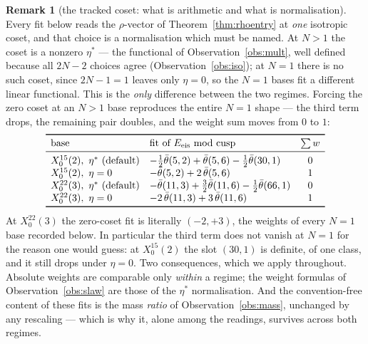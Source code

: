 \documentclass[11pt,reqno]{amsart}
\theoremstyle{plain}
\theoremstyle{definition}
\newtheorem{remark}[theorem]{Remark}
\begin{document}
\begin{remark}[the tracked coset: what is arithmetic and what is normalisation]\label{rem:coset}
Every fit below reads the $\rho$-vector of Theorem~\ref{thm:rhoentry} at \emph{one}
isotropic coset, and that choice is a normalisation which must be named. At $N>1$ the
coset is a nonzero $\eta^*$ --- the functional of Observation~\ref{obs:mult}, well defined
because all $2N-2$ choices agree (Observation~\ref{obs:iso}); at $N=1$ there is no such
coset, since $2N-1=1$ leaves only $\eta=0$, so the $N=1$ bases fit a different linear
functional. This is the \emph{only} difference between the two regimes. Forcing the zero
coset at an $N>1$ base reproduces the entire $N=1$ shape --- the third term drops, the
remaining pair doubles, and the weight sum moves from $0$ to $1$:
\[
\begin{array}{llc}
\toprule
\text{base} & \text{fit of }E_{\mathrm{eis}}\text{ mod cusp} & \sum w\\
\midrule
X_0^{15}(2),\ \eta^*\ (\text{default})
  & -\tfrac12\bar\theta(5,2)+\bar\theta(5,6)-\tfrac12\bar\theta(30,1) & 0\\
X_0^{15}(2),\ \eta=0
  & -\bar\theta(5,2)+2\,\bar\theta(5,6) & 1\\
X_0^{22}(3),\ \eta^*\ (\text{default})
  & -\bar\theta(11,3)+\tfrac32\bar\theta(11,6)-\tfrac12\bar\theta(66,1) & 0\\
X_0^{22}(3),\ \eta=0
  & -2\,\bar\theta(11,3)+3\,\bar\theta(11,6) & 1\\
\bottomrule
\end{array}
\]
At $X_0^{22}(3)$ the zero-coset fit is literally $(-2,+3)$, the weights of every $N=1$
base recorded below. In particular the third term does not vanish at $N=1$ for the reason
one would guess: at $X_0^{15}(2)$ the slot $(30,1)$ is definite, of one class, and it
still drops under $\eta=0$. Two consequences, which we apply throughout. Absolute weights
are comparable only \emph{within} a regime; the weight formulas of
Observation~\ref{obs:slaw} are those of the $\eta^*$ normalisation. And the
convention-free content of these fits is the mass \emph{ratio} of
Observation~\ref{obs:mass}, unchanged by any rescaling --- which is why it, alone among
the readings, survives across both regimes.
\end{remark}
\end{document}

